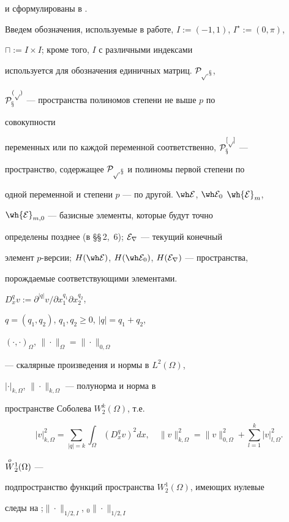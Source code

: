 и сформулированы в \cite{iva-kor4}.





Введем обозначения, используемые в работе, $I:=(-1,1)$, $I^\star:=(0,\pi)$,


$\sqcap:=I\times I$; кроме того, $I$ с различными индексами


используется для обозначения единичных матриц. $\cal P_{p,x}$,


$\cal P_x^{(p)}$ --- пространства полиномов степени не выше $p$ по


совокупности


переменных или по каждой переменной соответственно, $\cal P_x^{[p]}$ ---


пространство, содержащее $\cal P_{p,x}$ и полиномы первой степени по


одной переменной и степени $p$ --- по другой. $\E $, $\E_0$ $\wh{\cal E}_m$,


$\wh{\cal E}_{m,0}$ --- базисные элементы, которые будут точно


определены позднее (в \S\S\,2,~6); $\cal E_r$ --- текущий конечный


элемент $p$-версии; $H(\E)$, $H(\E_0)$, $H(\cal E_r)$ --- пространства,


порождаемые соответствующими элементами.


$D_x^qv:=\partial^{|q|}v/\partial x^{q_1}_1\partial x_2^{q_2}$,


$q=(q_1,q_2)$, $q_1,q_2\ge0$, $|q|=q_1+q_2$,


$(\cdot,\cdot)_\Omega$, $\|\cdot\|_\Omega =\|\cdot\|_{0,\Omega}$


--- скалярные произведения и нормы в $L^2(\Omega)$,


$|\cdot|_{k,\Omega }$, $\|\cdot\|_{k,\Omega} $ --- полунорма и норма в


пространстве Соболева $W_2^k (\Omega )$, т.е.


$$


|v|_{k,\Omega }^2=\sum_{|q|=k}\int_\Omega


(D_x^q v)^2dx,\quad\|v\|_{k,\Omega}^2=\|v\|_{0,\Omega }^2+


\sum_{l=1}^k | v|_{l,\Omega} ^2.


$$


$\overset{o}{W}{}_2^1(\Omega)$ ---


подпространство функций пространства $W_2^1(\Omega)$, имеющих нулевые


следы на \bo;\linebreak $\|\cdot\|_{1/2,I}$, ${}_0\|\cdot\|_{1/2,I}$


